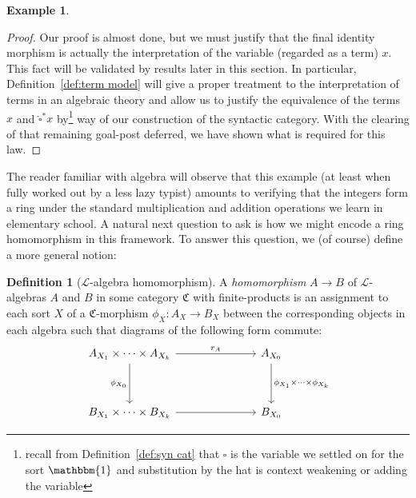 \documentclass[12pt,twoside]{reedthesis}
\theoremstyle{definition}
\newtheorem{definition}{Definition}
\newtheorem{example}{Example}
\theoremstyle{remark}
\theoremstyle{plain}
\begin{document}
\begin{example}
\begin{enumerate}
\begin{proof}
            Our proof is almost done, but we must justify that the final
            identity morphism is actually the interpretation of the variable
            (regarded as a term) $x$. This fact will be validated by results
            later in this section. In particular, Definition~\ref{def:term
              model} will give a proper treatment to the interpretation of terms
            in an algebraic theory and allow us to justify the equivalence of
            the terms $x$ and $\hat{\square}^{*} x$ by\footnote{recall from
              Definition~\ref{def:syn cat} that $\square$ is the variable we settled
              on for the sort $\mathbbm{1}$ and substitution by the hat is
              context weakening or adding the variable} way of our construction
            of the syntactic category. With the clearing of that remaining
            goal-post deferred, we have shown what is required for this law.
          \end{proof}
  \end{enumerate}
\end{example}

The reader familiar with algebra will observe that this example (at least when
fully worked out by a less lazy typist) amounts to verifying that the integers
form a ring under the standard multiplication and addition operations we learn
in elementary school. A natural next question to ask is how we might encode a
ring homomorphism in this framework. To answer this question, we (of course)
define a more general notion:

\begin{definition}[$\mathcal{L}$-algebra homomorphism]\label{def:homomorphism}
  A \emph{homomorphism} \( A \rightarrow B\) of $\mathcal{L}$-algebras $A$ and $B$ in some
  category $\mathfrak{C}$ with finite-products is an assignment to each sort $X$
  of a $\mathfrak{C}$-morphism \( \phi_{X} : A_{X} \rightarrow B_{X}\) between the
  corresponding objects in each algebra such that diagrams of the following form
  commute:
  \[\begin{tikzcd}
      {A_{X_1}\times\cdots \times A_{X_k}} &&& {A_{X_0}} \\
      \\
      {B_{X_1}\times\cdots\times B_{X_k}} &&& {B_{X_0}}
      \arrow["{r_A}", from=1-1, to=1-4]
      \arrow["{\phi_{X_0}}"', from=1-1, to=3-1]
      \arrow[from=3-1, to=3-4]
      \arrow["{\phi_{X_1}\times \cdots \times \phi_{X_k}}", from=1-4, to=3-4]
    \end{tikzcd}\]

\end{definition}
\end{document}
